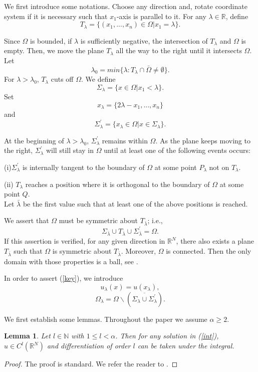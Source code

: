 \documentclass[12pt]{amsproc}
\theoremstyle{plain}
\numberwithin{equation}{section}
\newtheorem{lem}{Lemma}[section]
\begin{document}
We first introduce some notations. Choose any direction and, rotate
coordinate system if it is necessary such that $x_1$-axis is
parallel to it. For any $\lambda\in \mathbb R$, define
$$T_\lambda=\{(x_1,...,x_n)\in \Omega | x_1=\lambda \}.$$

Since $\Omega$ is bounded, if $\lambda$ is sufficiently negative,
the intersection of $T_\lambda$ and $\Omega$ is empty. Then, we move
the plane $T_\lambda$ all the way to the right until it intersects
$\Omega$. Let
$$\lambda_0=min\{\lambda :T_\lambda\cap\bar\Omega\not= \emptyset\}.$$
For $\lambda>\lambda_0$, $T_\lambda$ cuts off $\Omega$. We define
$$ \Sigma_\lambda=\{x\in \Omega |x_1<\lambda\}.$$
Set
$$x_\lambda=\{2\lambda-x_1,...,x_n\} $$
and
$$
\Sigma^\prime_\lambda=\{x_\lambda\in\Omega|x\in\Sigma_\lambda\}.$$

At the beginning of $\lambda>\lambda_0$, $ \Sigma^\prime_\lambda$
remains within $\Omega$. As the plane keeps moving to the right,  $
\Sigma^\prime_\lambda$ will still stay in $\Omega$ until at least
one of the following events occurs:

(i)$ \Sigma^\prime_\lambda$ is internally tangent to the boundary of
$\Omega$ at some point $P_\lambda$ not on $T_\lambda$.
\medskip

(ii) $T_\lambda$ reaches a position where it is orthogonal to the
boundary of $\Omega$ at some point $Q$.\\ Let $\bar\lambda$ be the
first value such that at least one of the above positions is
reached.

We assert that $\Omega$ must be symmetric about $T_{\bar\lambda}$;
i.e.,
\begin{equation}
\Sigma_{\bar\lambda}\cup T_{\bar\lambda}\cup
\Sigma^\prime_{\bar\lambda}=\Omega. \label{key}
\end{equation}
If this assertion is verified, for any given direction in $\mathbb
R^N$, there also exists a plane $T_{\bar\lambda}$ such that $\Omega$
is symmetric about $T_{\bar\lambda}$. Moreover, $\Omega$ is
connected. Then the only domain with those properties is a ball, see
\cite{Al}.

In order to assert (\ref{key}), we introduce
$$u_\lambda(x)=u(x_\lambda),$$
$$
\Omega_\lambda=\Omega\backslash(\overline{\Sigma_\lambda\cup\Sigma^\prime_\lambda}).$$

 We first establish  some lemmas. Throughout the paper we assume
 $\alpha\geq 2$.

 \begin{lem}
 Let $l\in\mathbb N$ with $1\leq l<\alpha$. Then for any solution in
 (\ref{int}), $u\in C^l(\mathbb R^N)$ and differentiation of order $l$
 can be taken under the integral.
\label{mono}
 \end{lem}
 \begin{proof}
 The proof is standard. We refer the reader  to \cite{R2}.
 \end{proof}
\end{document}
